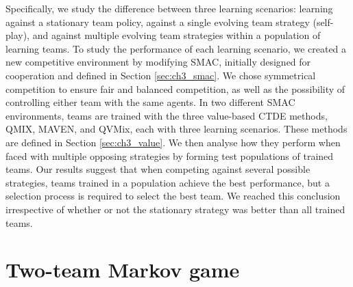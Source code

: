 Specifically, we study the difference between three learning scenarios: learning against a stationary team policy, against a single evolving team strategy (self-play), and against multiple evolving team strategies within a population of learning teams.
To study the performance of each learning scenario, we created a new competitive environment by modifying SMAC, initially designed for cooperation and defined in Section \ref{sec:ch3_smac}.
We chose symmetrical competition to ensure fair and balanced competition, as well as the possibility of controlling either team with the same agents.
In two different SMAC environments, teams are trained with the three value-based CTDE methods, QMIX, MAVEN, and QVMix, each with three learning scenarios.
These methods are defined in Section \ref{sec:ch3_value}.
We then analyse how they perform when faced with multiple opposing strategies by forming test populations of trained teams.
Our results suggest that when competing against several possible strategies, teams trained in a population achieve the best performance, but a selection process is required to select the best team.
We reached this conclusion irrespective of whether or not the stationary strategy was better than all trained teams.

\section{Two-team Markov game}\label{sec:ch7_2teammarkov}

